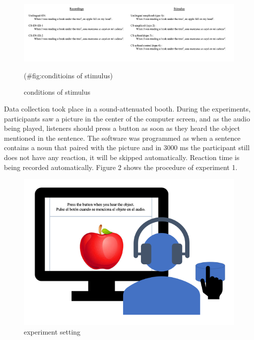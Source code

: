 \documentclass[
  english,
  man,floatsintext]{apa6}
\begin{document}
\begin{figure}

{\centering \includegraphics[width=9.05in]{figure/figure_conditions_stimuli} 

}

\caption{conditions of stimulus}(\#fig:conditioins of stimulus)
\end{figure}

Data collection took place in a sound-attenuated booth. During the experiments, participants saw a picture in the center of the computer screen, and as the audio being played, listeners should press a button as soon as they heard the object mentioned in the sentence. The software was programmed as when a sentence contains a noun that paired with the picture and in 3000 ms the participant still does not have any reaction, it will be skipped automatically. Reaction time is being recorded automatically. Figure 2 shows the procedure of experiment 1.

\begin{figure}

{\centering \includegraphics[width=11.32in]{figure/figure_setting} 

}

\caption{experiment setting}\label{fig:setting}
\end{figure}
\end{document}
